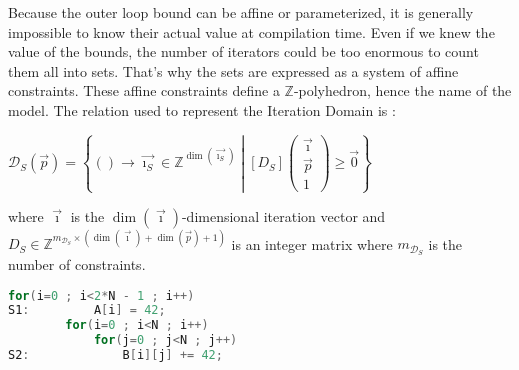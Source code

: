 \documentclass[paper=a4, fontsize=11pt]{scrartcl}
\numberwithin{equation}{section}        %
\numberwithin{figure}{section}          %
\numberwithin{table}{section}               %
\begin{document}
        Because the outer loop bound can be affine or parameterized, it is generally impossible to
        know their actual value at compilation time. Even if we knew the value of the
        bounds, the number of iterators could be too enormous to count them all into sets.
        That's why the sets are expressed as a system of affine constraints.
        These affine constraints define a $\mathbb{Z}$-polyhedron, hence the name of the model.
        The relation used to represent the Iteration Domain is :
        \begin{center}
            $ \mathcal{D}_S(\vec{p}) = \left\{() \to \vec{\imath_S} \in \mathbb{Z}^{\dim(\vec{\imath_S})}
            \middle|
            \left[D_S\right]\begin{pmatrix}\vec{\imath} \\ \vec{p} \\ 1\end{pmatrix}
            \geq \vec{0}
            \right\}$
        \end{center}
        where $\vec{\imath}$ is the $\dim(\vec{\imath})$-dimensional iteration vector and
        $D_S \in \mathbb{Z}^{m_{\mathcal{D}_S} \times (\dim(\vec{\imath})+\dim(\vec{p})+1)}$
        is an integer matrix where $m_{\mathcal{D}_S}$ is the number of constraints.
        \\

\begin{lstlisting}[frame=single, language=C, caption={Simple code for polyhedral model example}, label={lst:polyhedral_example}]
        for(i=0 ; i<2*N - 1 ; i++)
S1:         A[i] = 42;
        for(i=0 ; i<N ; i++)
            for(j=0 ; j<N ; j++)
S2:             B[i][j] += 42;
\end{lstlisting}
        
\end{document}
